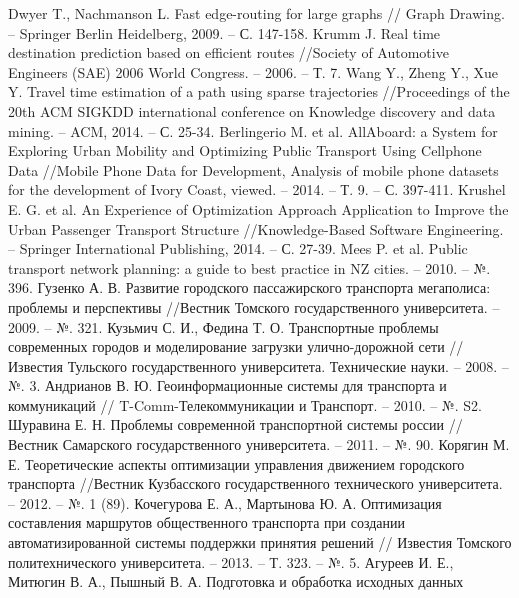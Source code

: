 \begin{thebibliography}{10}
     Dwyer T., Nachmanson L. Fast edge-routing for large graphs //
        Graph Drawing. -- Springer Berlin Heidelberg, 2009. -- С. 147-158.
     Krumm J. Real time destination prediction based on efficient routes //Society of 
        Automotive Engineers (SAE) 2006 World Congress. -- 2006. -- Т. 7.
     Wang Y., Zheng Y., Xue Y. Travel time estimation of a path using sparse 
        trajectories //Proceedings of the 20th ACM SIGKDD international conference on Knowledge 
        discovery and data mining. -- ACM, 2014. -- С. 25-34.
     Berlingerio M. et al. AllAboard: a System for Exploring Urban Mobility and 
        Optimizing Public Transport Using Cellphone Data //Mobile Phone Data for Development, Analysis 
        of mobile phone datasets for the development of Ivory Coast, 
        viewed. -- 2014. -- Т. 9. -- С. 397-411.
     Krushel E. G. et al. An Experience of Optimization Approach Application to Improve 
        the Urban Passenger Transport Structure //Knowledge-Based Software Engineering. -- Springer 
        International Publishing, 2014. -- С. 27-39.
     Mees P. et al. Public transport network planning: a guide to best practice in NZ 
        cities. -- 2010. -- №. 396.
     Гузенко А. В. Развитие городского пассажирского транспорта мегаполиса: проблемы 
        и перспективы //Вестник Томского государственного университета. -- 2009. -- №. 321.
     Кузьмич С. И., Федина Т. О. Транспортные проблемы современных городов и 
        моделирование загрузки улично-дорожной сети //Известия Тульского государственного 
        университета. Технические науки. -- 2008. -- №. 3.
     Андрианов В. Ю. Геоинформационные системы для транспорта и коммуникаций //
        T-Comm-Телекоммуникации и Транспорт. -- 2010. -- №. S2.
     Шуравина Е. Н. Проблемы современной транспортной системы россии //
        Вестник Самарского государственного университета. -- 2011. -- №. 90.
     Корягин М. Е. Теоретические аспекты оптимизации управления движением городского 
        транспорта //Вестник Кузбасского государственного технического университета. -- 2012. -- №. 1 (89).
     Кочегурова Е. А., Мартынова Ю. А. Оптимизация составления маршрутов общественного 
        транспорта при создании автоматизированной системы поддержки принятия решений //
        Известия Томского политехнического университета. -- 2013. -- Т. 323. -- №. 5.
     Агуреев И. Е., Митюгин В. А., Пышный В. А. Подготовка и обработка исходных данных 

\end{thebibliography}
